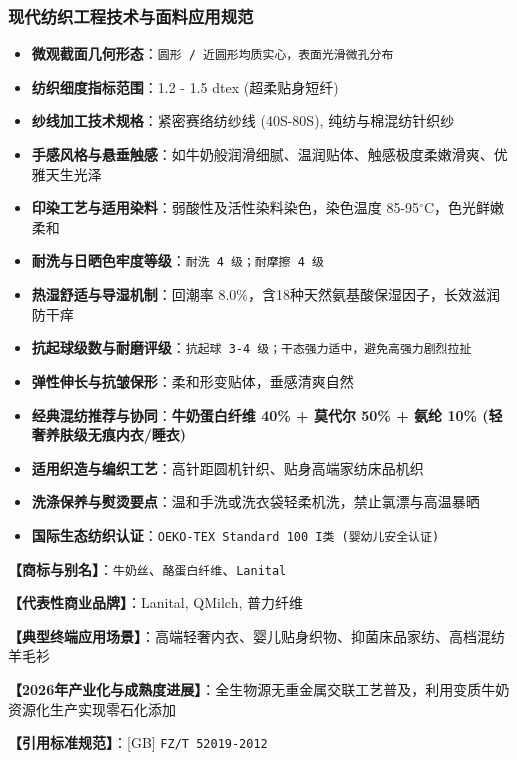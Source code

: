 \documentclass[11pt,openright,twoside,UTF8]{ctexbook}
\begin{document}
\subsubsection*{现代纺织工程技术与面料应用规范}
\begin{itemize} \setlength{\itemsep}{2pt}
    \item \textbf{微观截面几何形态}：\texttt{圆形 / 近圆形均质实心，表面光滑微孔分布}
    \item \textbf{纺织细度指标范围}：1.2 - 1.5 dtex (超柔贴身短纤)
    \item \textbf{纱线加工技术规格}：紧密赛络纺纱线 (40S-80S), 纯纺与棉混纺针织纱
    \item \textbf{手感风格与悬垂触感}：如牛奶般润滑细腻、温润贴体、触感极度柔嫩滑爽、优雅天生光泽
    \item \textbf{印染工艺与适用染料}：弱酸性及活性染料染色，染色温度 85-95$^\circ\mathrm{C}$，色光鲜嫩柔和
    \item \textbf{耐洗与日晒色牢度等级}：\texttt{耐洗 4 级；耐摩擦 4 级}
    \item \textbf{热湿舒适与导湿机制}：回潮率 8.0\%，含18种天然氨基酸保湿因子，长效滋润防干痒
    \item \textbf{抗起球级数与耐磨评级}：\texttt{抗起球 3-4 级；干态强力适中，避免高强力剧烈拉扯}
    \item \textbf{弹性伸长与抗皱保形}：柔和形变贴体，垂感清爽自然
    \item \textbf{经典混纺推荐与协同}：\textbf{牛奶蛋白纤维 40\% + 莫代尔 50\% + 氨纶 10\% (轻奢养肤级无痕内衣/睡衣)}
    \item \textbf{适用织造与编织工艺}：高针距圆机针织、贴身高端家纺床品机织
    \item \textbf{洗涤保养与熨烫要点}：温和手洗或洗衣袋轻柔机洗，禁止氯漂与高温暴晒
    \item \textbf{国际生态纺织认证}：\texttt{OEKO-TEX Standard 100 I类 (婴幼儿安全认证)}
\end{itemize}
\vspace{0.2cm}

\noindent\textbf{【商标与别名】}：\texttt{牛奶丝}、\texttt{酪蛋白纤维}、\texttt{Lanital}\par
\noindent\textbf{【代表性商业品牌】}：Lanital, QMilch, 普力纤维\par
\noindent\textbf{【典型终端应用场景】}：高端轻奢内衣、婴儿贴身织物、抑菌床品家纺、高档混纺羊毛衫\par
\noindent\textbf{【2026年产业化与成熟度进展】}：全生物源无重金属交联工艺普及，利用变质牛奶资源化生产实现零石化添加\par
\noindent\textbf{【引用标准规范】}：[GB] \texttt{FZ/T 52019-2012}\par
\vspace{0.5cm}
\end{document}
